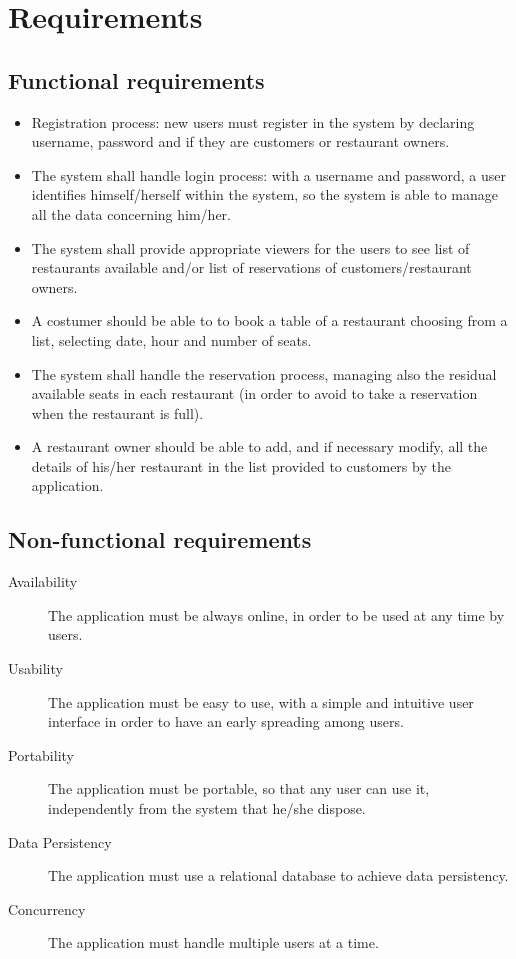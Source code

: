 \section{Requirements}

\subsection{Functional requirements}

\begin{itemize}
	\item Registration process: new users must register in the system by
		declaring username, password and if they are customers or
		restaurant owners.
	\item The system shall handle login process: with a username and
		password, a user identifies himself/herself within the system,
		so the system is able to manage all the data concerning him/her.
	\item The system shall provide appropriate viewers for the users to see
		list of restaurants available and/or list of reservations of
		customers/restaurant owners.
	\item A costumer should be able to to book a table of a restaurant
		choosing from a list, selecting date, hour and number of seats.
	\item The system shall handle the reservation process, managing also the
		residual available seats in each restaurant (in order to avoid
		to take a reservation when the restaurant is full).
	\item A restaurant owner should be able to add, and if necessary modify,
		all the details of his/her restaurant in the list provided to
		customers by the application.
\end{itemize}

\subsection{Non-functional requirements}

\begin{description}
	\item[Availability] The application must be always online, in order to
		be used at any time by users.
	\item[Usability] The application must be easy to use, with a simple and
		intuitive user interface in order to have an early spreading
		among users.
	\item[Portability] The application must be portable, so that any user
		can use it, independently from the system that he/she dispose.
	\item[Data Persistency] The application must use a relational database
		to achieve data persistency.
	\item[Concurrency] The application must handle multiple users at a time.
\end{description}
